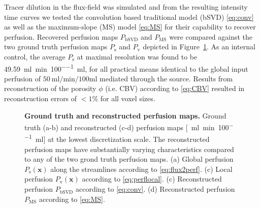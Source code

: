 \documentclass[10pt]{article}
\begin{document}
	
	Tracer dilution in the flux-field was simulated and from the resulting intensity time curves we tested the convolution based traditional model (bSVD) \eqref{eq:conv} as well as the maximum-slope (MS) model \eqref{eq:MS} for their capability to recover perfusion. Recovered perfusion maps $P_{\mathrm{bSVD}}$ and $P_{\mathrm{MS}}$ were compared against the two ground truth perfusion maps $P_{\mathrm{s}}$ and $P_{\mathrm{v}}$ depicted in Figure~\ref{fig:perfusionmaps}. As an internal control, the average $P_{\mathrm{s}}$ at maximal resolution was found to be \SI{49.59}{\milli\litre\per\minute\per100\milli\litre}, for all practical means identical to the global input perfusion of $\SI{50}{\milli\litre\per\minute\per100\milli\litre}$ mediated through the source.	Results from reconstruction of the porosity $\phi$ (i.e. CBV) according to \eqref{eq:CBV} resulted in reconstruction errors of $<1\%$ for all voxel sizes. 

	
\begin{figure}[!h]
\caption{{\bf Ground truth and reconstructed perfusion maps.}
Ground truth (a-b) and reconstructed (c-d) perfusion maps [\SI{}{\milli\litre\per\minute\per 100\milli\litre}] at the lowest discretization scale. The reconstructed perfusion maps have substantially varying characteristics compared to any of the two grond truth perfusion maps. (a) Global perfusion $P_{\mathrm{s}}(\mathbf{x})$ along the streamlines according to \eqref{eq:flux2perf}. (c) Local perfusion $P_{\mathrm{v}}(\mathbf{x})$ according to \eqref{eq:perflocal}. (c) Reconstructed perfusion $P_{\mathrm{bSVD}}$ according to \eqref{eq:conv}. (d) Reconstructed perfusion $P_{\mathrm{MS}}$ according to \eqref{eq:MS}.}
\label{fig:perfusionmaps}
\end{figure}
\end{document}
